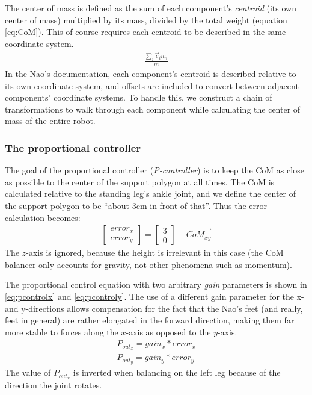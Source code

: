 \documentclass[a4paper]{article}
\begin{document}
The center of mass is defined as the sum of each component's
\emph{centroid} (its own center of mass) multiplied by its mass,
divided by the total weight (equation \ref{eq:CoM}). This of course
requires each centroid to be described in the same coordinate system.
\begin{align}
  \frac{\sum_i \vec{c}_i m_i} {m}        \label{eq:CoM}
\end{align}
In the Nao's documentation, each component's centroid is described relative to
its own coordinate system, and offsets are included to convert between adjacent
components’ coordinate systems. To handle this, we construct a chain of
transformations to walk through each component while calculating the center of
mass of the entire robot.

\subsubsection{The proportional controller}
The goal of the proportional controller (\emph{P-controller}) is to keep the
CoM as close as possible to the center of the support polygon at all times.
The CoM is calculated relative to the standing leg's ankle joint, and we define
the center of the support polygon to be ``about 3cm in front of that''. Thus the
error-calculation becomes:
\begin{align}
  \begin{bmatrix} error_x \\ error_y \end{bmatrix} = \begin{bmatrix} 3 \\ 0 \end{bmatrix} - \vec{CoM_{xy}} 
\end{align}
The $z$-axis is ignored, because the height is irrelevant in this case (the CoM
balancer only accounts for gravity, not other phenomena such as momentum).

The proportional control equation with two arbitrary \emph{gain} parameters is
shown in \ref{eq:pcontrolx} and \ref{eq:pcontroly}. The use of a different gain
parameter for the x- and y-directions allows compensation for the fact that the
Nao's feet (and really, feet in general) are rather elongated in the forward
direction, making them far more stable to forces along the $x$-axis as opposed to
the $y$-axis.
\begin{align}
  P_{out_{x}} = gain_x * error_x        \label{eq:pcontrolx} \\
  P_{out_{y}} = gain_y * error_y        \label{eq:pcontroly}
\end{align}
The value of $P_{out_{x}}$ is inverted when balancing on the left leg because of
the direction the joint rotates.
\end{document}
